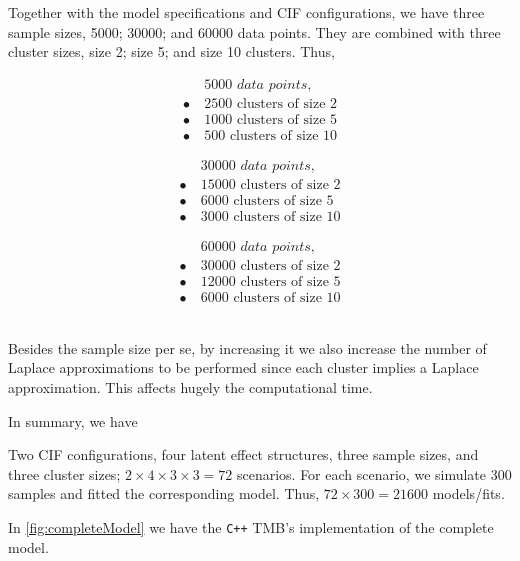 Together with the model specifications and CIF configurations, we have
three sample sizes, 5000; 30000; and 60000 data points. They are
combined with three cluster sizes, size 2; size 5; and size 10
clusters. Thus,
\begin{minipage}{\textwidth/3}
 \begin{align*}
          &\textit{5000 data points},\\
  \bullet~&\text{2500 clusters of size 2}\\
  \bullet~&\text{1000 clusters of size 5}\\
  \bullet~&\text{500 clusters of size 10}
 \end{align*}
\end{minipage}%
\begin{minipage}{\textwidth/3}
 \begin{align*}
          &\textit{30000 data points},\\
  \bullet~&\text{15000 clusters of size 2}\\
  \bullet~&\text{6000 clusters of size 5}\\
  \bullet~&\text{3000 clusters of size 10}
 \end{align*}
\end{minipage}%
\begin{minipage}{\textwidth/3}
 \begin{align*}
          &\textit{60000 data points},\\
  \bullet~&\text{30000 clusters of size 2}\\
  \bullet~&\text{12000 clusters of size 5}\\
  \bullet~&\text{6000 clusters of size 10}
 \end{align*}
\end{minipage}\\

Besides the sample size per se, by increasing it we also increase the
number of Laplace approximations to be performed since each cluster
implies a Laplace approximation. This affects hugely the computational
time.

In summary, we have

Two CIF configurations, four latent effect structures, three sample
sizes, and three cluster sizes; \(2 \times 4 \times 3 \times 3 = 72\)
scenarios. For each scenario, we simulate 300 samples and fitted the
corresponding model. Thus, \(72 \times 300 = 21600\) models/fits.

In \autoref{fig:completeModel} we have the \texttt{C++} TMB's
implementation of the complete model.

